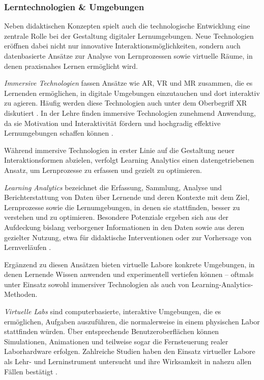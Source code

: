 \subsubsection{Lerntechnologien \& Umgebungen}

Neben didaktischen Konzepten spielt auch die technologische Entwicklung eine zentrale Rolle bei der Gestaltung digitaler Lernumgebungen. Neue Technologien eröffnen dabei nicht nur innovative Interaktionsmöglichkeiten, sondern auch datenbasierte Ansätze zur Analyse von Lernprozessen sowie virtuelle Räume, in denen praxisnahes Lernen ermöglicht wird.

\textit{Immersive Technologien} fassen Ansätze wie \ac{AR}, \ac{VR} und \ac{MR} zusammen, die es Lernenden ermöglichen, in digitale Umgebungen einzutauchen und dort interaktiv zu agieren. Häufig werden diese Technologien auch unter dem Oberbegriff \ac{XR} diskutiert \parencites[S.~82]{alnagrat_review_2022}[S.~256]{chen_information_2024}. In der Lehre finden immersive Technologien zunehmend Anwendung, da sie Motivation und Interaktivität fördern und hochgradig effektive Lernumgebungen schaffen können \parencite[S.~1]{izouaouen_education_2025}.

Während immersive Technologien in erster Linie auf die Gestaltung neuer Interaktionsformen abzielen, verfolgt Learning Analytics einen datengetriebenen Ansatz, um Lernprozesse zu erfassen und gezielt zu optimieren.

\textit{Learning Analytics} bezeichnet die Erfassung, Sammlung, Analyse und Berichterstattung von Daten über Lernende und deren Kontexte mit dem Ziel, Lernprozesse sowie die Lernumgebungen, in denen sie stattfinden, besser zu verstehen und zu optimieren. Besondere Potenziale ergeben sich aus der Aufdeckung bislang verborgener Informationen in den Daten sowie aus deren gezielter Nutzung, etwa für didaktische Interventionen oder zur Vorhersage von Lernverläufen \parencite[S.~294]{xiao_applying_2019}.

Ergänzend zu diesen Ansätzen bieten virtuelle Labore konkrete Umgebungen, in denen Lernende Wissen anwenden und experimentell vertiefen können – oftmals unter Einsatz sowohl immersiver Technologien als auch von Learning-Analytics-Methoden.

\textit{Virtuelle Labs} sind computerbasierte, interaktive Umgebungen, die es ermöglichen, Aufgaben auszuführen, die normalerweise in einem physischen Labor stattfinden würden. Über entsprechende Benutzeroberflächen können Simulationen, Animationen und teilweise sogar die Fernsteuerung realer Laborhardware erfolgen. Zahlreiche Studien haben den Einsatz virtueller Labore als Lehr- und Lerninstrument untersucht und ihre Wirksamkeit in nahezu allen Fällen bestätigt \parencite[S.~117]{achuthan_value_2011}.

